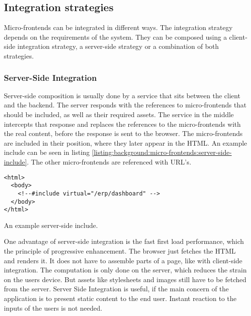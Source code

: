 \subsection{Integration strategies}\label{subsection:background:micro-frontend-architecture:integration-strategies}

Micro-frontends can be integrated in different ways. The integration strategy depends on the requirements of the system. They can be composed using a client-side integration strategy, a server-side strategy or a combination of both strategies.

\subsubsection{Server-Side Integration}\label{subsubsection:background:micro-frontend-architecture:integration-strategies:server-side-integration}

Server-side composition is usually done by a service that sits between the client and the backend. \cite[60]{book:2020:geers:background:micro-frontends:micro-frontends-in-action} The server responds with the references to micro-frontends that should be included, as well as their required assets. The service in the middle intercepts that response and replaces the references to the micro-frontends with the real content, before the response is sent to the browser. The micro-frontends are included in their position, where they later appear in the HTML. An example include can be seen in listing \ref{listing:background:micro-frontends:server-side-include}. The other micro-frontends are referenced with URL's. \cite[61-63]{book:2020:geers:background:micro-frontends:micro-frontends-in-action}

\ifshowListings
\begin{listing}[H]
    \begin{verbatim}
<html>
  <body>
    <!--#include virtual="/erp/dashboard" -->
  </body>
</html>
    \end{verbatim}
    \caption{An example server-side include.}\label{listing:background:micro-frontends:server-side-include}
\end{listing}
\fi

\bigskip

\noindent One advantage of server-side integration is the fast first load performance, which the principle of progressive enhancement. \cite{book:2010:parker:background:micro-frontends:designing-with-progressive-enhancement} The browser just fetches the HTML and renders it. It does not have to assemble parts of a page, like with client-side integration. The computation is only done on the server, which reduces the strain on the users device. \cite{book:2020:geers:background:micro-frontends:micro-frontends-in-action} But assets like stylesheets and images still have to be fetched from the server. Server Side Integration is useful, if the main concern of the application is to present static content to the end user. Instant reaction to the inputs of the users is not needed. \cite[83]{book:2020:geers:background:micro-frontends:micro-frontends-in-action}


